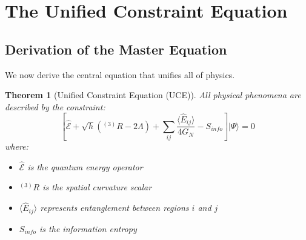 \documentclass[12pt,a4paper]{article}
\newtheorem{theorem}{Theorem}[section]
\begin{document}
\section{The Unified Constraint Equation}

\subsection{Derivation of the Master Equation}

We now derive the central equation that unifies all of physics.

\begin{theorem}[Unified Constraint Equation (UCE)]
All physical phenomena are described by the constraint:
\begin{equation}
\boxed{
\left[ \hat{\mathcal{E}} + \sqrt{h}\left({}^{(3)}R - 2\Lambda\right) + \sum_{ij} \frac{\langle \hat{E}_{ij} \rangle}{4G_N} - S_{info} \right] |\Psi\rangle = 0
}
\end{equation}
where:
\begin{itemize}
\item $\hat{\mathcal{E}}$ is the quantum energy operator
\item ${}^{(3)}R$ is the spatial curvature scalar
\item $\langle \hat{E}_{ij} \rangle$ represents entanglement between regions $i$ and $j$
\item $S_{info}$ is the information entropy
\end{itemize}
\end{theorem}
\end{document}
